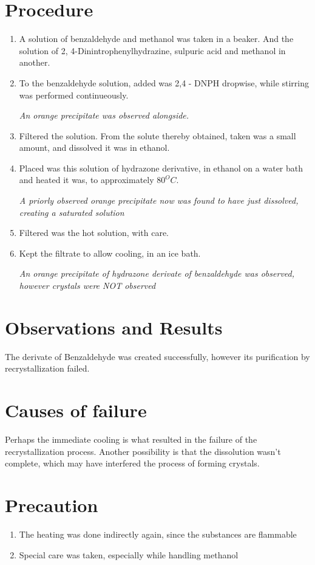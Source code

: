 \section{Procedure}
	\begin{enumerate}
		\item A solution of benzaldehyde and methanol was taken in a beaker. And the solution of 2, 4-Dinintrophenylhydrazine, sulpuric acid and methanol in another.
		\item To the benzaldehyde solution, added was 2,4 - DNPH dropwise, while stirring was performed continueously.
		\par
			\emph{An orange precipitate was observed alongside.}
		\item Filtered the solution. From the solute thereby obtained, taken was a small amount, and dissolved it was in ethanol.
		\item Placed was this solution of hydrazone derivative, in ethanol on a water bath and heated it was, to approximately $80 ^O C$.
		\par
			\emph{A priorly observed orange precipitate now was found to have just dissolved, creating a saturated solution}			
		\item Filtered was the hot solution, with care.
		\item Kept the filtrate to allow cooling, in an ice bath.
		\par
			\emph{An orange precipitate of hydrazone derivate of benzaldehyde was observed, however crystals were NOT observed}
	\end{enumerate}

\section{Observations and Results}
	The derivate of Benzaldehyde was created successfully, however its purification by recrystallization failed.

\section{Causes of failure}
	Perhaps the immediate cooling is what resulted in the failure of the recrystallization process. Another possibility is that the dissolution wasn't complete, which may have interfered the process of forming crystals.

\section{Precaution}
	\begin{enumerate}
		\item The heating was done indirectly again, since the substances are flammable
		\item Special care was taken, especially while handling methanol
	\end{enumerate}

